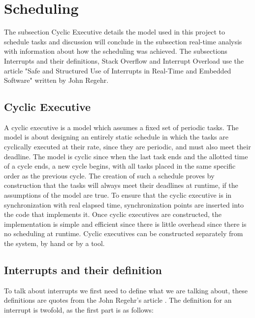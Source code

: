 \section{Scheduling}
\label{sec:Scheduling}
The subsection Cyclic Executive details the model used in this project to schedule tasks and discussion will conclude in the subsection real-time analysis with information about how the scheduling was achieved. 
The subsections Interrupts and their definitions, Stack Overflow and Interrupt Overload use the article "Safe and Structured Use of Interrupts in Real-Time and
Embedded Software" written by John Regehr. \citep{safe}


\subsection{Cyclic Executive}
\label{sec:Cyclic Executive}
A cyclic executive is a model which assumes a fixed set of periodic tasks\citep{rtsbog}. The model is about designing an entirely static schedule in which the tasks are cyclically executed at their rate, since they are periodic, and must also meet their deadline. The model is cyclic since when the last task ends and the allotted time of a cycle ends, a new cycle begins, with all tasks placed in the same specific order as the previous cycle. The creation of such a schedule proves by construction that the tasks will always meet their deadlines at runtime, if the assumptions of the model are true\citep{rtsbog}. \newline
To ensure that the cyclic executive is in synchronization with real elapsed time, synchronization points are inserted into the code that implements it.
Once cyclic executives are constructed, the implementation is simple and efficient since there is little overhead since there is no scheduling at runtime\citep{rtsbog}. Cyclic executives can be constructed separately from the system, by hand or by a tool.

\subsection{Interrupts and their definition}
\label{sec:Interrupts and their definition}
To talk about interrupts we first need to define what we are talking about, these definitions are quotes from the John Regehr's article \citep{safe}. The definition for an interrupt is twofold, as the first part is as follows:

